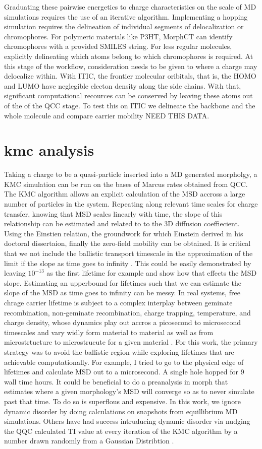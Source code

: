 \indent Graduating these pairwise energetics to charge characteristics on the scale of MD simulations
requires the use of an iterative algorithm. Implementing a hopping simulation requires the delineation of
individual segments of delocalization or chromophores. For polymeric materials like P3HT, MorphCT
can identify chromophores with a provided SMILES string. For less regular molecules, explicitly delineating
which atoms belong to which chromophores is required. At this stage of the workflow, consideration needs to be
given to where a charge may delocalize within. With ITIC, the frontier molecular oribitals, that is, the HOMO
and LUMO have neglegible electon density along the side chains. With that, significant computational recources
can be conserved by leaving these atoms out of the of the QCC stage. To test this on ITIC we delineate the
backbone and the whole molecule and compare carrier mobility NEED THIS DATA. 

\section{\nobreak kmc analysis}
Taking a charge to be a quasi-particle inserted into a MD generated morpholgy, a KMC
simulation can be run on the bases of Marcus rates obtained from QCC.
The KMC algorithm allows an explicit calculation of the MSD accross a large number of 
particles in the system. Repeating along relevant time scales for 
charge transfer, knowing that MSD scales linearly with time, the slope of this relationship
can be estimated and related to to the 3D diffusion coeffiecient. Using the Einstien relation, 
the groundwork for which Einstein derived in his doctoral dissertaion, finally the zero-field
mobility can be obtained. 
It is critical that we not include the ballistic transport timescale in the approximation of the limit
if the slope as time goes to infinity \cite{Maginn2018} . This could be easily demonstrated by leaving $10^{-13}$ as the first
lifetime for example and show how that effects the MSD slope. Estimating an upperbound for lifetimes such that
we can estimate the slope of the MSD as time goes to infinity can be messy. In real systems, free chrage
carrier lifetime is subject to a complex interplay between geminate recombination, non-geminate recombination,
charge trapping, temperature, and charge density, whose dynamics play out accros a picosecond to microsecond
timescales and vary widly form material to material as well as from microstrtucture to microstrucute for a
given material \cite{Laquai2015} . For this work, the primary strategy was to avoid the ballistic region while exploring lifetimes
that are achievable computationally. For example, I tried to go to the physical edge of lifetimes and
calculate MSD out to a microsecond. A single hole hopped for 9 wall  time hours. It could be beneficial to do
a preanalysis in morph that estimates where a given morphology's MSD will converge so as to never simulate
past that time. To do so is superflous and expensive. 
In this work, we ignore dynamic disorder by doing calculations on snapshots from equillibrium MD simulations.
Others have had success intruducing dynamic disorder via nudging the QQC calculated TI value at every
iteration of the KMC algorithm by a number drawn randomly from a Gaussian Distribtion \cite{Gali2017}.
